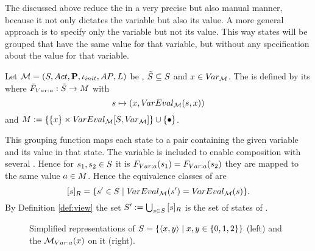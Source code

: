 \documentclass[preview]{standalone}
\begin{document}
The \viewsN discussed above reduce the \chgphN in a very precise but also manual manner, because it not only dictates the variable but also its value. A more general approach is to specify only the variable but not its value. This way states will be grouped that have the same value for that variable, but without any specification about the value for that variable.

\begin{definition}
	Let ${{{\mathcal{M}}}} = {{({S}, {Act}, {\textbf{P}}, {\iota_{init}}, {AP}, {L})}}$ be \achgphN, ${\tilde{{S}}} \subseteq {S}$ and $x \in {V\!ar_{\ensuremath{{{\mathcal{M}}}}}}$. The \viewN \viewparamvalident is defined by its \grpfctN \gfctparamvalident where ${{\tilde{F}_{{Var:{a}}}}} : {\tilde{{S}}} \to {\ensuremath{{M}}}$ with
	\[
	{s} \mapsto (x,{V\!arEval_{{{\mathcal{M}}}}}({s},{x}))
	\]
	and $\imggrp := \{\{x\} \times \varevalimg\} \cup \{\remelem\}$.
\end{definition}

This grouping function maps each state to a pair containing the given variable and its value in that state. The variable is included to enable composition with several \viewparamvalident. Hence for ${s}_1, {s}_2 \in {S}$ it is ${{F_{{Var:{a}}}}}({s}_1) = {{F_{{Var:{a}}}}}({s}_2)$ \iffN they are mapped to the same value ${a} \in {\ensuremath{{M}}}$. Hence the equivalence classes of \eqrelview are
\[
{{[{s}]_{{R}}}} = \{ {s}' \in {S} \mid {V\!arEval_{\ensuremath{{{\mathcal{M}}}}}}({s}') = {V\!arEval_{{{\mathcal{M}}}}}({s})\}.
\]
By Definition \ref{def:view} the set ${S}' := \bigcup_{{s} \in {S}} {{[{s}]_{{R}}}}$ is the set of states of \viewparamvalident.

\begin{figure}[!htb]
	\begin{minipage}{.6\textwidth}
		
	\end{minipage}%
	\begin{minipage}{.5\textwidth}
		
	\end{minipage}
	\caption{Simplified representations of \mdp ${S} = \{{\langle x,y\rangle} \mid x,y \in \{0, 1, 2\}\}$ (left) and the \viewN ${{{{{\mathcal{M}}}}_{{Var:{a}}}}}(x)$ on it (right).}
	\label{fig:varValIdent} 
\end{figure}
\end{document}
